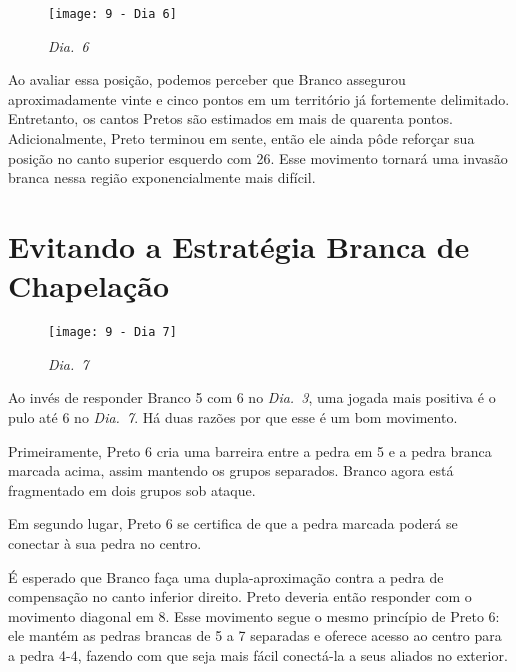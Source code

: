 \begin{wrapfigure}{l}{60mm}
    \vspace{-22.5pt}
    \begin{center}
        \texttt{[image: 9 - Dia 6]}
        \captionsetup{justification=centering}
        \caption*{\emph{Dia.\@~6}}
    \end{center}
    \vspace{-30pt}
\end{wrapfigure}

Ao avaliar essa posição, podemos perceber que Branco assegurou aproximadamente vinte e cinco pontos em um território já fortemente delimitado. Entretanto, os cantos Pretos são estimados em mais de quarenta pontos. Adicionalmente, Preto terminou em sente, então ele ainda pôde reforçar sua posição no canto superior esquerdo com 26. Esse movimento tornará uma invasão branca nessa região exponencialmente mais difícil.

\pagebreak

\section{Evitando a Estratégia Branca de Chapelação}

\begin{wrapfigure}{r}{60mm}
    \vspace{-27.5pt}
    \begin{center}
        \texttt{[image: 9 - Dia 7]}
        \captionsetup{justification=centering}
        \caption*{\emph{Dia.\@~7}}
    \end{center}
    \vspace{-37.5pt}
\end{wrapfigure}

Ao invés de responder Branco 5 com 6 no \emph{Dia.\@~3}, uma jogada mais positiva é o pulo até 6 no \emph{Dia.\@~7}. Há duas razões por que esse é um bom movimento.

Primeiramente, Preto 6 cria uma barreira entre a pedra em 5 e a pedra branca marcada acima, assim mantendo os grupos separados. Branco agora está fragmentado em dois grupos sob ataque.

Em segundo lugar, Preto 6 se certifica de que a pedra marcada poderá se conectar à sua pedra no centro.

É esperado que Branco faça uma dupla-aproximação contra a pedra de compensação no canto inferior direito. Preto deveria então responder com o movimento diagonal em 8. Esse movimento segue o mesmo princípio de Preto 6: ele mantém as pedras brancas de 5 a 7 separadas e oferece acesso ao centro para a pedra 4-4, fazendo com que seja mais fácil conectá-la a seus aliados no exterior.

